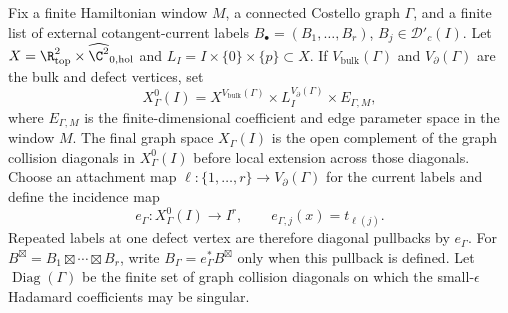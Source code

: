 \begin{defn}
\label{def:app-wavefront-admissible-defect-labels}
  Fix a finite Hamiltonian window \(M\), a connected Costello graph
  \(\Gamma\), and a finite list of external cotangent-current labels
  \(B_\bullet=(B_1,\ldots,B_r)\), \(B_j\in\mathcal D'_c(I)\).  Let
  \(X=\R^2_{\mathrm{top}}\times\widehat{\C^2}_{0,\mathrm{hol}}\) and
  \(L_I=I\times\{0\}\times\{p\}\subset X\).  If
  \(V_{\mathrm{bulk}}(\Gamma)\) and \(V_{\partial}(\Gamma)\) are the bulk
  and defect vertices, set
  \[
    X^0_\Gamma(I)=
    X^{V_{\mathrm{bulk}}(\Gamma)}
    \times L_I^{V_{\partial}(\Gamma)}
    \times E_{\Gamma,M},
  \]
  where \(E_{\Gamma,M}\) is the finite-dimensional coefficient and edge
  parameter space in the window \(M\).  The final graph space
  \(X_\Gamma(I)\) is the open complement of the graph collision
  diagonals in \(X^0_\Gamma(I)\) before local extension across those
  diagonals.  Choose an attachment map
  \(\ell:\{1,\ldots,r\}\to V_{\partial}(\Gamma)\) for the current labels
  and define the incidence map
  \[
    e_\Gamma:X^0_\Gamma(I)\longrightarrow I^r,\qquad
    e_{\Gamma,j}(x)=t_{\ell(j)} .
  \]
  Repeated labels at one defect vertex are therefore diagonal pullbacks
  by \(e_\Gamma\).  For
  \(B^\boxtimes=B_1\boxtimes\cdots\boxtimes B_r\), write
  \(B_\Gamma=e_\Gamma^*B^\boxtimes\) only when this pullback is defined.
  Let
  \(\operatorname{Diag}(\Gamma)\) be the finite set of graph collision
  diagonals on which the small-\(\epsilon\) Hadamard coefficients may be
  singular.


\end{defn}
